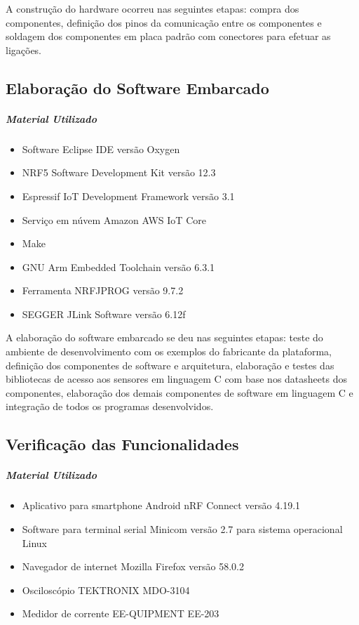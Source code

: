 A construção do hardware ocorreu nas seguintes etapas: compra dos
componentes, definição dos pinos da comunicação entre os componentes e soldagem
dos componentes em placa padrão com conectores para efetuar as ligações.


\subsection{Elaboração do Software Embarcado}

\subparagraph{Material Utilizado}
\begin{itemize}[noitemsep]
  \item Software Eclipse IDE versão Oxygen
  \item NRF5 Software Development Kit versão 12.3
  \item Espressif IoT Development Framework versão 3.1
  \item Serviço em núvem Amazon AWS IoT Core
  \item Make
  \item GNU Arm Embedded Toolchain versão 6.3.1
  \item Ferramenta NRFJPROG versão 9.7.2
  \item SEGGER JLink Software versão 6.12f
\end{itemize}

A elaboração do software embarcado se deu nas seguintes etapas: teste do
ambiente de desenvolvimento com os exemplos do fabricante da plataforma,
definição dos componentes de software e arquitetura, elaboração e testes das
bibliotecas de acesso aos sensores em linguagem C com base nos datasheets dos
componentes, elaboração dos demais componentes de software em linguagem C e
integração de todos os programas desenvolvidos.

\subsection{Verificação das Funcionalidades}

\subparagraph{Material Utilizado}
\begin{itemize}[noitemsep]
  \item Aplicativo para smartphone Android nRF Connect versão 4.19.1
  \item Software para terminal serial Minicom versão 2.7 para sistema
  operacional Linux
  \item Navegador de internet Mozilla Firefox versão 58.0.2
  \item Osciloscópio TEKTRONIX MDO-3104
  \item Medidor de corrente EE-QUIPMENT EE-203
\end{itemize}

